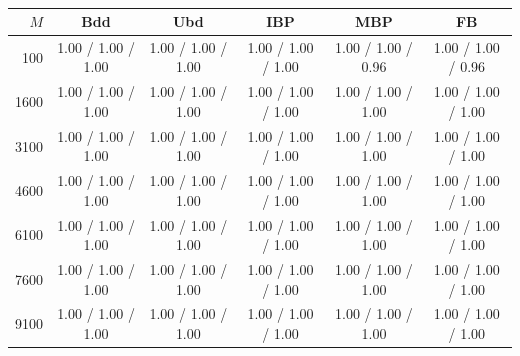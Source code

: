 \begin{table}[ht!]
    \centering
    \small
    \begin{tabular}{r c c c c c}
    \hline
    $M$ & Bdd & Ubd & IBP & MBP & FB \\
    \hline
    100 & 1.00 / 1.00 / 1.00 & 1.00 / 1.00 / 1.00 & 1.00 / 1.00 / 1.00 & 1.00 / 1.00 / 0.96 & 1.00 / 1.00 / 0.96 \\
    1600 & 1.00 / 1.00 / 1.00 & 1.00 / 1.00 / 1.00 & 1.00 / 1.00 / 1.00 & 1.00 / 1.00 / 1.00 & 1.00 / 1.00 / 1.00 \\
    3100 & 1.00 / 1.00 / 1.00 & 1.00 / 1.00 / 1.00 & 1.00 / 1.00 / 1.00 & 1.00 / 1.00 / 1.00 & 1.00 / 1.00 / 1.00 \\
    4600 & 1.00 / 1.00 / 1.00 & 1.00 / 1.00 / 1.00 & 1.00 / 1.00 / 1.00 & 1.00 / 1.00 / 1.00 & 1.00 / 1.00 / 1.00 \\
    6100 & 1.00 / 1.00 / 1.00 & 1.00 / 1.00 / 1.00 & 1.00 / 1.00 / 1.00 & 1.00 / 1.00 / 1.00 & 1.00 / 1.00 / 1.00 \\
    7600 & 1.00 / 1.00 / 1.00 & 1.00 / 1.00 / 1.00 & 1.00 / 1.00 / 1.00 & 1.00 / 1.00 / 1.00 & 1.00 / 1.00 / 1.00 \\
    9100 & 1.00 / 1.00 / 1.00 & 1.00 / 1.00 / 1.00 & 1.00 / 1.00 / 1.00 & 1.00 / 1.00 / 1.00 & 1.00 / 1.00 / 1.00 \\
    \hline
    \end{tabular}
    \caption{}
    \label{tab:Exp1_features_constant}
\end{table}
